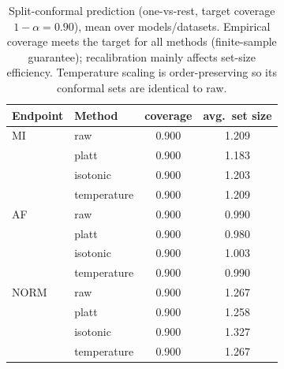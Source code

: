 \begin{table}[t]
\centering
\caption{Split-conformal prediction (one-vs-rest, target coverage $1-\alpha=0.90$), mean over models/datasets. Empirical coverage meets the target for all methods (finite-sample guarantee); recalibration mainly affects set-size efficiency. Temperature scaling is order-preserving so its conformal sets are identical to raw.}
\label{tab:conformal}
\small
\begin{tabular}{llcc}
\toprule
Endpoint & Method & coverage & avg.\ set size \\
\midrule
  MI & raw & 0.900 & 1.209 \\
   & platt & 0.900 & 1.183 \\
   & isotonic & 0.900 & 1.203 \\
   & temperature & 0.900 & 1.209 \\
  \midrule
  AF & raw & 0.900 & 0.990 \\
   & platt & 0.900 & 0.980 \\
   & isotonic & 0.900 & 1.003 \\
   & temperature & 0.900 & 0.990 \\
  \midrule
  NORM & raw & 0.900 & 1.267 \\
   & platt & 0.900 & 1.258 \\
   & isotonic & 0.900 & 1.327 \\
   & temperature & 0.900 & 1.267 \\
\bottomrule
\end{tabular}
\end{table}